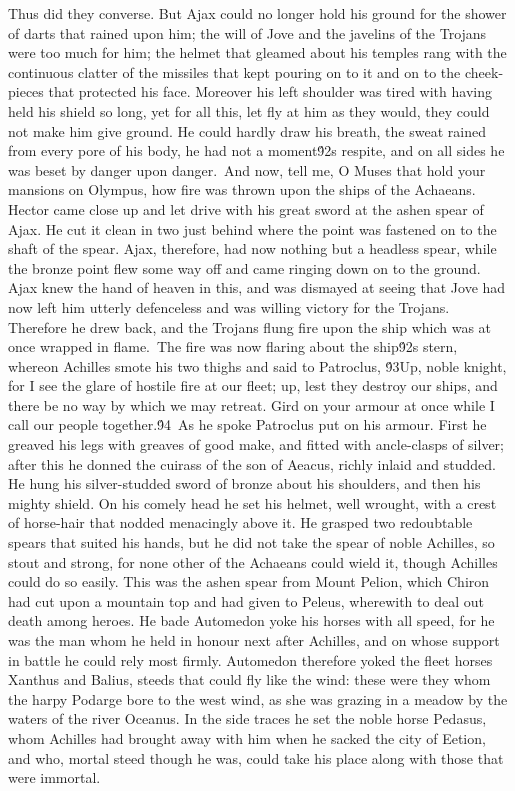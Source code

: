 {Thus did they converse. But Ajax could no longer hold his ground for the shower of darts that rained upon him; the will of Jove and the javelins of the Trojans were too much for him; the helmet that gleamed about his temples rang with the continuous clatter of the missiles that kept pouring on to it and on to the cheek-pieces that protected his face. Moreover his left shoulder was tired with having held his shield so long, yet for all this, let fly at him as they would, they could not make him give ground. He could hardly draw his breath, the sweat rained from every pore of his body, he had not a moment\'92s respite, and on all sides he was beset by danger upon danger.\
And now, tell me, O Muses that hold your mansions on Olympus, how fire was thrown upon the ships of the Achaeans. Hector came close up and let drive with his great sword at the ashen spear of Ajax. He cut it clean in two just behind where the point was fastened on to the shaft of the spear. Ajax, therefore, had now nothing but a headless spear, while the bronze point flew some way off and came ringing down on to the ground. Ajax knew the hand of heaven in this, and was dismayed at seeing that Jove had now left him utterly defenceless and was willing victory for the Trojans. Therefore he drew back, and the Trojans flung fire upon the ship which was at once wrapped in flame.\
The fire was now flaring about the ship\'92s stern, whereon Achilles smote his two thighs and said to Patroclus, \'93Up, noble knight, for I see the glare of hostile fire at our fleet; up, lest they destroy our ships, and there be no way by which we may retreat. Gird on your armour at once while I call our people together.\'94\
As he spoke Patroclus put on his armour. First he greaved his legs with greaves of good make, and fitted with ancle-clasps of silver; after this he donned the cuirass of the son of Aeacus, richly inlaid and studded. He hung his silver-studded sword of bronze about his shoulders, and then his mighty shield. On his comely head he set his helmet, well wrought, with a crest of horse-hair that nodded menacingly above it. He grasped two redoubtable spears that suited his hands, but he did not take the spear of noble Achilles, so stout and strong, for none other of the Achaeans could wield it, though Achilles could do so easily. This was the ashen spear from Mount Pelion, which Chiron had cut upon a mountain top and had given to Peleus, wherewith to deal out death among heroes. He bade Automedon yoke his horses with all speed, for he was the man whom he held in honour next after Achilles, and on whose support in battle he could rely most firmly. Automedon therefore yoked the fleet horses Xanthus and Balius, steeds that could fly like the wind: these were they whom the harpy Podarge bore to the west wind, as she was grazing in a meadow by the waters of the river Oceanus. In the side traces he set the noble horse Pedasus, whom Achilles had brought away with him when he sacked the city of Eetion, and who, mortal steed though he was, could take his place along with those that were immortal.\
}
